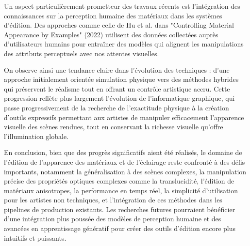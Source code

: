 \documentclass{article}
\begin{document}
Un aspect particulièrement prometteur des travaux récents est l'intégration des connaissances sur la perception humaine des matériaux dans les systèmes d'édition. Des approches comme celle de Hu et al. dans "Controlling Material Appearance by Examples" (2022) utilisent des données collectées auprès d'utilisateurs humains pour entraîner des modèles qui alignent les manipulations des attributs perceptuels avec nos attentes visuelles.

On observe ainsi une tendance claire dans l'évolution des techniques : d'une approche initialement orientée simulation physique vers des méthodes hybrides qui préservent le réalisme tout en offrant un contrôle artistique accru. Cette progression reflète plus largement l'évolution de l'informatique graphique, qui passe progressivement de la recherche de l'exactitude physique à la création d'outils expressifs permettant aux artistes de manipuler efficacement l'apparence visuelle des scènes rendues, tout en conservant la richesse visuelle qu'offre l'illumination globale.

En conclusion, bien que des progrès significatifs aient été réalisés, le domaine de l'édition de l'apparence des matériaux et de l'éclairage reste confronté à des défis importants, notamment la généralisation à des scènes complexes, la manipulation précise des propriétés optiques complexes comme la translucidité, l'édition de matériaux anisotropes, la performance en temps réel, la simplicité d'utilisation pour les artistes non techniques, et l'intégration de ces méthodes dans les pipelines de production existants. Les recherches futures pourraient bénéficier d'une intégration plus poussée des modèles de perception humaine et des avancées en apprentissage génératif pour créer des outils d'édition encore plus intuitifs et puissants.
\end{document}

